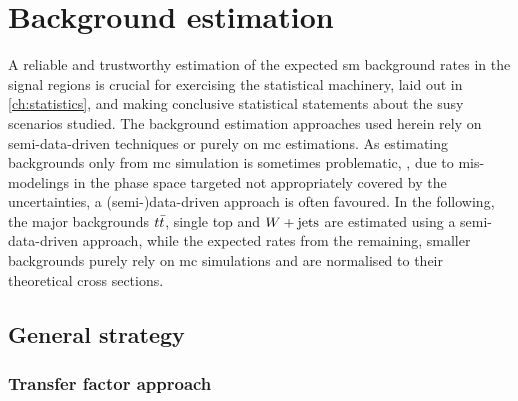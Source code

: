 

\chapter{Background estimation}\label{ch:background_estimation}

\graphicspath{{chapter-background/Figs/Vector/}{chapter-background/Figs/}}


A reliable and trustworthy estimation of the expected \gls{sm} background rates in the signal regions is crucial for exercising the statistical machinery, laid out in \cref{ch:statistics}, and making conclusive statistical statements about the \gls{susy} scenarios studied.
The background estimation approaches used herein rely on semi-data-driven techniques or purely on \gls{mc} estimations.
As estimating backgrounds only from \gls{mc} simulation is sometimes problematic, \eg, due to mis-modelings in the phase space targeted not appropriately covered by the uncertainties, a (semi-)data-driven approach is often favoured.
In the following, the major backgrounds $t\bar{t}$, single top and $W+\mathrm{jets}$ are estimated using a semi-data-driven approach, while the expected rates from the remaining, smaller backgrounds purely rely on \gls{mc} simulations and are normalised to their theoretical cross sections.

\section{General strategy}

\subsection{Transfer factor approach}

